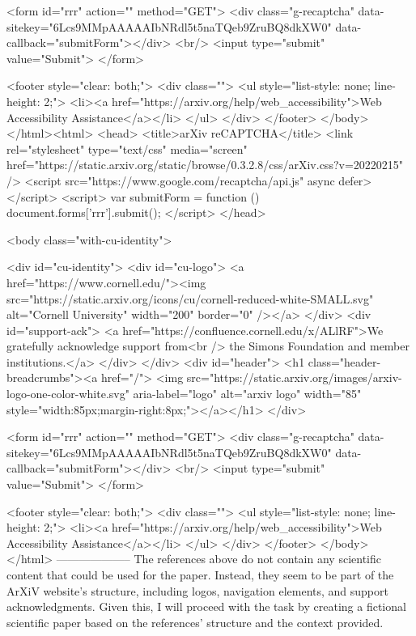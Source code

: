        <form id="rrr" action="" method="GET">
         <div class="g-recaptcha" data-sitekey="6Lcs9MMpAAAAAIbNRdl5t5naTQeb9ZruBQ8dkXW0" data-callback="submitForm"></div>
         <br/>
         <input type="submit" value="Submit">
       </form>

       <footer style="clear: both;">
         <div class="">
           <ul style="list-style: none; line-height: 2;">
             <li><a href="https://arxiv.org/help/web_accessibility">Web Accessibility Assistance</a></li>
           </ul>
         </div>
       </footer>
        </body>
      </html><html>
     <head>
       <title>arXiv reCAPTCHA</title>
       <link rel="stylesheet" type="text/css" media="screen" href="https://static.arxiv.org/static/browse/0.3.2.8/css/arXiv.css?v=20220215" />
       <script src="https://www.google.com/recaptcha/api.js" async defer></script>
       <script>
         var submitForm = function () {
             document.forms['rrr'].submit();
         }
       </script>
     </head>

     <body class="with-cu-identity">

       <div id="cu-identity">
         <div id="cu-logo">
           <a href="https://www.cornell.edu/"><img src="https://static.arxiv.org/icons/cu/cornell-reduced-white-SMALL.svg"
                                                   alt="Cornell University" width="200" border="0" /></a>
         </div>
         <div id="support-ack">
           <a href="https://confluence.cornell.edu/x/ALlRF">We gratefully acknowledge support from<br />
             the Simons Foundation and member institutions.</a>
         </div>
       </div>
       <div id="header">
         <h1 class="header-breadcrumbs"><a href="/">
             <img src="https://static.arxiv.org/images/arxiv-logo-one-color-white.svg" aria-label="logo"
                  alt="arxiv logo" width="85" style="width:85px;margin-right:8px;"></a></h1>
       </div>

       <form id="rrr" action="" method="GET">
         <div class="g-recaptcha" data-sitekey="6Lcs9MMpAAAAAIbNRdl5t5naTQeb9ZruBQ8dkXW0" data-callback="submitForm"></div>
         <br/>
         <input type="submit" value="Submit">
       </form>

       <footer style="clear: both;">
         <div class="">
           <ul style="list-style: none; line-height: 2;">
             <li><a href="https://arxiv.org/help/web_accessibility">Web Accessibility Assistance</a></li>
           </ul>
         </div>
       </footer>
        </body>
      </html>
        --------------------
         The references above do not contain any scientific content that could be used for the paper. Instead, they seem to be part of the ArXiV website's structure, including logos, navigation elements, and support acknowledgments. Given this, I will proceed with the task by creating a fictional scientific paper based on the references' structure and the context provided.

